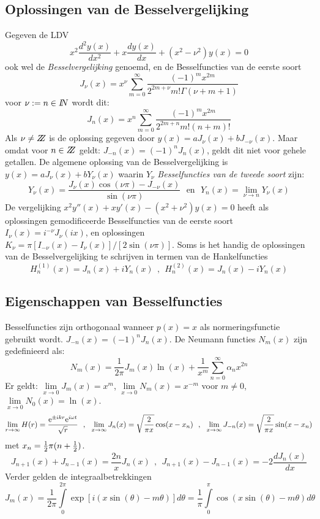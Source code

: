 \subsection{Oplossingen van de Besselvergelijking}
Gegeven de LDV
\[
x^2\frac{d^2y(x)}{dx^2}+x\frac{dy(x)}{dx}+(x^2-\nu^2)y(x)=0
\]
ook wel de {\it Besselvergelijking} genoemd, en de Besselfuncties van de eerste
soort
\[
J_\nu(x)=x^\nu\sum_{m=0}^\infty\frac{(-1)^mx^{2m}}{2^{2m+\nu}m!\Gamma(\nu+m+1)}
\]
voor $\nu:=n\in I\hspace{-1mm}N$ wordt dit:
\[
J_n(x)=x^n\sum_{m=0}^\infty\frac{(-1)^mx^{2m}}{2^{2m+n}m!(n+m)!}
\]
Als $\nu\neq Z\hspace{-1ex}Z$ is de oplossing gegeven door $y(x)=aJ_\nu(x)+bJ_{-\nu}(x)$.
Maar omdat voor $n\in Z\hspace{-1ex}Z$ geldt: $J_{-n}(x)=(-1)^nJ_n(x)$, geldt dit niet voor
gehele getallen. De algemene oplossing van de Besselvergelijking is
$y(x)=aJ_\nu(x)+bY_\nu(x)$ waarin $Y_\nu$ {\it Besselfuncties van de tweede
soort} zijn:
\[
Y_\nu(x)=\frac{J_\nu(x)\cos(\nu\pi)-J_{-\nu}(x)}{\sin(\nu\pi)}~~~\mbox{en}~~~
Y_n(x)=\lim_{\nu\rightarrow n}Y_\nu(x)
\]
De vergelijking $x^2y''(x)+xy'(x)-(x^2+\nu^2)y(x)=0$ heeft als oplossingen
gemodificeerde Besselfuncties van de eerste soort $I_\nu(x)=i^{-\nu}J_\nu(ix)$,
en oplossingen $K_\nu=\pi[I_{-\nu}(x)-I_\nu(x)]/[2\sin(\nu\pi)]$.
\npar
Soms is het handig de oplossingen van de Besselvergelijking te schrijven in
termen van de Hankelfuncties
\[
H^{(1)}_n(x)=J_n(x)+iY_n(x)~~,~~H^{(2)}_n(x)=J_n(x)-iY_n(x)
\]

\subsection{Eigenschappen van Besselfuncties}
Besselfuncties zijn orthogonaal wanneer $p(x)=x$ als normeringsfunctie gebruikt
wordt.
\npar
$J_{-n}(x)=(-1)^nJ_n(x)$. De Neumann functies $N_m(x)$ zijn gedefinieerd als:
\[
N_m(x)=\frac{1}{2\pi}J_m(x)\ln(x)+\frac{1}{x^m}\sum_{n=0}^\infty \alpha_nx^{2n}
\]
Er geldt: $\lim\limits_{x\rightarrow0}J_m(x)=x^m$,
$\lim\limits_{x\rightarrow0}N_m(x)=x^{-m}$ voor $m\neq0$,
$\lim\limits_{x\rightarrow0}N_0(x)=\ln(x)$.
\[
\lim_{r\rightarrow\infty}H(r)=\frac{{\rm e}^{\pm ikr}{\rm e}^{i\omega t}}{\sqrt{r}}~~,~~
\lim_{x\rightarrow\infty}J_n(x)=\sqrt{\frac{2}{\pi x}}\cos(x-x_n)~~,~~
\lim_{x\rightarrow\infty}J_{-n}(x)=\sqrt{\frac{2}{\pi x}}\sin(x-x_n)
\]
met $x_n=\mbox{$\frac{1}{2}$}\pi(n+\mbox{$\frac{1}{2}$})$.
\[
J_{n+1}(x)+J_{n-1}(x)=\frac{2n}{x}J_n(x)~~,~~J_{n+1}(x)-J_{n-1}(x)=-2\frac{dJ_n(x)}{dx}
\]
Verder gelden de integraalbetrekkingen
\[
J_m(x)=\frac{1}{2\pi}\int\limits_0^{2\pi}\exp[i(x\sin(\theta)-m\theta)]d\theta=
\frac{1}{\pi}\int\limits_0^\pi\cos(x\sin(\theta)-m\theta)d\theta
\]

